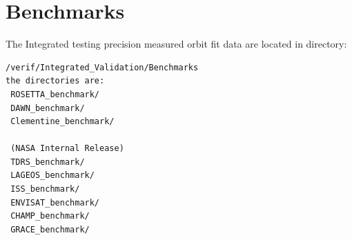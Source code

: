 \chapter{Benchmarks}\label{ap:bench}
The Integrated testing precision measured orbit fit data are located in directory:
\begin{verbatim}
/verif/Integrated_Validation/Benchmarks
the directories are:
 ROSETTA_benchmark/
 DAWN_benchmark/
 Clementine_benchmark/

 (NASA Internal Release)
 TDRS_benchmark/
 LAGEOS_benchmark/
 ISS_benchmark/
 ENVISAT_benchmark/
 CHAMP_benchmark/
 GRACE_benchmark/
\end{verbatim}
